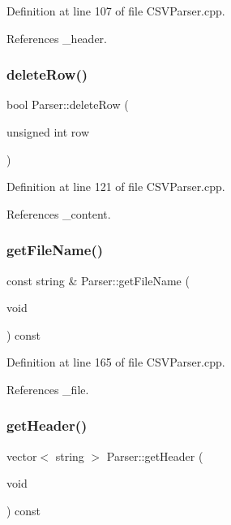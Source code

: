Definition at line 107 of file C\+S\+V\+Parser.\+cpp.



References \+\_\+header.

\mbox{\label{class_parser_a8f625a8081a5bde560d46d18d04efb2e}} 
\subsubsection{deleteRow()}
{\footnotesize\ttfamily bool Parser\+::delete\+Row (\begin{DoxyParamCaption}\item[{unsigned int}]{row }\end{DoxyParamCaption})}



Definition at line 121 of file C\+S\+V\+Parser.\+cpp.



References \+\_\+content.

\mbox{\label{class_parser_a3201b8253f4ea1c4420f3637c6c8de2b}} 
\subsubsection{getFileName()}
{\footnotesize\ttfamily const string \& Parser\+::get\+File\+Name (\begin{DoxyParamCaption}\item[{void}]{ }\end{DoxyParamCaption}) const}



Definition at line 165 of file C\+S\+V\+Parser.\+cpp.



References \+\_\+file.

\mbox{\label{class_parser_a0e9fb5d631e2e95685c67d8d59e1ba50}} 
\subsubsection{getHeader()}
{\footnotesize\ttfamily vector$<$ string $>$ Parser\+::get\+Header (\begin{DoxyParamCaption}\item[{void}]{ }\end{DoxyParamCaption}) const}




